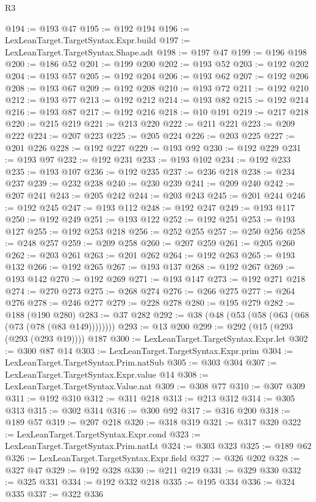 \begin{lexlean}{R3}
\begin{coremodule}
@194 := @193 @47
@195 := @192 @194
@196 := LexLeanTarget.TargetSyntax.Expr.build
@197 := LexLeanTarget.TargetSyntax.Shape.adt
@198 := @197 @47
@199 := @196 @198
@200 := @186 @52
@201 := @199 @200
@202 := @193 @52
@203 := @192 @202
@204 := @193 @57
@205 := @192 @204
@206 := @193 @62
@207 := @192 @206
@208 := @193 @67
@209 := @192 @208
@210 := @193 @72
@211 := @192 @210
@212 := @193 @77
@213 := @192 @212
@214 := @193 @82
@215 := @192 @214
@216 := @193 @87
@217 := @192 @216
@218 := @10 @191
@219 := @217 @218
@220 := @215 @219
@221 := @213 @220
@222 := @211 @221
@223 := @209 @222
@224 := @207 @223
@225 := @205 @224
@226 := @203 @225
@227 := @201 @226
@228 := @192 @227
@229 := @193 @92
@230 := @192 @229
@231 := @193 @97
@232 := @192 @231
@233 := @193 @102
@234 := @192 @233
@235 := @193 @107
@236 := @192 @235
@237 := @236 @218
@238 := @234 @237
@239 := @232 @238
@240 := @230 @239
@241 := @209 @240
@242 := @207 @241
@243 := @205 @242
@244 := @203 @243
@245 := @201 @244
@246 := @192 @245
@247 := @193 @112
@248 := @192 @247
@249 := @193 @117
@250 := @192 @249
@251 := @193 @122
@252 := @192 @251
@253 := @193 @127
@255 := @192 @253 @218
@256 := @252 @255
@257 := @250 @256
@258 := @248 @257
@259 := @209 @258
@260 := @207 @259
@261 := @205 @260
@262 := @203 @261
@263 := @201 @262
@264 := @192 @263
@265 := @193 @132
@266 := @192 @265
@267 := @193 @137
@268 := @192 @267
@269 := @193 @142
@270 := @192 @269
@271 := @193 @147
@273 := @192 @271 @218
@274 := @270 @273
@275 := @268 @274
@276 := @266 @275
@277 := @264 @276
@278 := @246 @277
@279 := @228 @278
@280 := @195 @279
@282 := @188 (@190 @280)
@283 := @37 @282
@292 := @38 (@48 (@53 (@58 (@63 (@68 (@73 (@78 (@83 @149))))))))
@293 := @13 @200
@299 := @292 (@15 (@293 (@293 (@293 @19)))) @187
@300 := LexLeanTarget.TargetSyntax.Expr.let
@302 := @300 @87 @14
@303 := LexLeanTarget.TargetSyntax.Expr.prim
@304 := LexLeanTarget.TargetSyntax.Prim.natSub
@305 := @303 @304
@307 := LexLeanTarget.TargetSyntax.Expr.value @14
@308 := LexLeanTarget.TargetSyntax.Value.nat
@309 := @308 @77
@310 := @307 @309
@311 := @192 @310
@312 := @311 @218
@313 := @213 @312
@314 := @305 @313
@315 := @302 @314
@316 := @300 @92
@317 := @316 @200
@318 := @189 @57
@319 := @207 @218
@320 := @318 @319
@321 := @317 @320
@322 := LexLeanTarget.TargetSyntax.Expr.cond
@323 := LexLeanTarget.TargetSyntax.Prim.natLt
@324 := @303 @323
@325 := @189 @62
@326 := LexLeanTarget.TargetSyntax.Expr.field
@327 := @326 @202
@328 := @327 @47
@329 := @192 @328
@330 := @211 @219
@331 := @329 @330
@332 := @325 @331
@334 := @192 @332 @218
@335 := @195 @334
@336 := @324 @335
@337 := @322 @336

\end{coremodule}
\end{lexlean}
